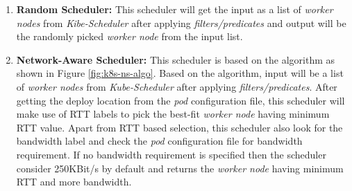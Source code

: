 \begin{enumerate}
  \item \textbf{Random Scheduler:} This scheduler will get the input as a list of \emph{worker nodes} from \emph{Kibe-Scheduler} after applying \emph{filters/predicates} and output will be the randomly picked \emph{worker node} from the input list\cite{Santos2019}.
  \item \textbf{Network-Aware Scheduler:} This scheduler is based on the algorithm as shown in Figure \ref{fig:k8s-ns-algo}. Based on the algorithm, input will be a list of \emph{worker nodes} from \emph{Kube-Scheduler} after applying \emph{filters/predicates}. After getting the deploy location from the \emph{pod} configuration file, this scheduler will make use of RTT labels to pick the best-fit \emph{worker node} having minimum RTT value\cite{Santos2019}. Apart from RTT based selection, this scheduler also look for the bandwidth label and check the \emph{pod} configuration file for bandwidth requirement\cite{Santos2019}. If no bandwidth requirement is specified then the scheduler consider 250KBit/s by default and returns the \emph{worker node} having minimum RTT and more bandwidth\cite{Santos2019}.
\end{enumerate}
